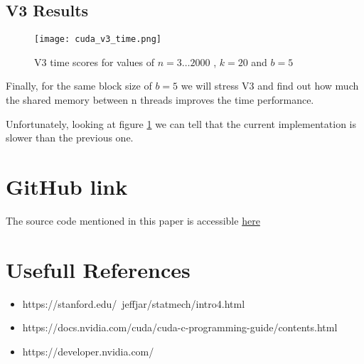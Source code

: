\documentclass[twocolumn]{article}
\begin{document}
\subsection{V3 Results}

\begin{figure}[htbp]
    \centering
    \texttt{[image: cuda\_v3\_time.png]}
    \caption{V3 time scores for values of $n = 3 \dots 2000 $ , $k = 20$ and $b = 5$ }
    \label{fig:cuda_v3_time}
\end{figure}

Finally, for the same block size of $b = 5$ we will stress V3 and find out how much the shared memory between n threads improves the time performance.

Unfortunately, looking at figure \ref{fig:cuda_v3_time} we can tell that the current implementation is slower than the previous one.

\section{GitHub link}
The source code mentioned in this paper is accessible \href{https://github.com/e-kyriakos/Cellural_Automata_CUDA}{here}


\section{Usefull References}
\begin{itemize}
	\item https://stanford.edu/~jeffjar/statmech/intro4.html
	\item https://docs.nvidia.com/cuda/cuda-c-programming-guide/contents.html
	\item https://developer.nvidia.com/
\end{itemize}
\end{document}
